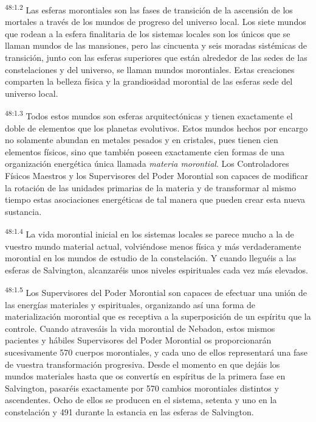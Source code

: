 \par
\textsuperscript{48:1.2} Las esferas morontiales son las fases de transición de la ascensión de los mortales a través de los mundos de progreso del universo local. Los siete mundos que rodean a la esfera finalitaria de los sistemas locales son los únicos que se llaman mundos de las mansiones, pero las cincuenta y seis moradas sistémicas de transición, junto con las esferas superiores que están alrededor de las sedes de las constelaciones y del universo, se llaman mundos morontiales. Estas creaciones comparten la belleza física y la grandiosidad morontial de las esferas sede del universo local.

\par
\textsuperscript{48:1.3} Todos estos mundos son esferas arquitectónicas y tienen exactamente el doble de elementos que los planetas evolutivos. Estos mundos hechos por encargo no solamente abundan en metales pesados y en cristales, pues tienen cien elementos físicos, sino que también poseen exactamente cien formas de una organización energética única llamada \textit{materia morontial}. Los Controladores Físicos Maestros y los Supervisores del Poder Morontial son capaces de modificar la rotación de las unidades primarias de la materia y de transformar al mismo tiempo estas asociaciones energéticas de tal manera que pueden crear esta nueva sustancia.

\par
\textsuperscript{48:1.4} La vida morontial inicial en los sistemas locales se parece mucho a la de vuestro mundo material actual, volviéndose menos física y más verdaderamente morontial en los mundos de estudio de la constelación. Y cuando lleguéis a las esferas de Salvington, alcanzaréis unos niveles espirituales cada vez más elevados.

\par
\textsuperscript{48:1.5} Los Supervisores del Poder Morontial son capaces de efectuar una unión de las energías materiales y espirituales, organizando así una forma de materialización morontial que es receptiva a la superposición de un espíritu que la controle. Cuando atravesáis la vida morontial de Nebadon, estos mismos pacientes y hábiles Supervisores del Poder Morontial os proporcionarán sucesivamente 570 cuerpos morontiales, y cada uno de ellos representará una fase de vuestra transformación progresiva. Desde el momento en que dejáis los mundos materiales hasta que os convertís en espíritus de la primera fase en Salvington, pasaréis exactamente por 570 cambios morontiales distintos y ascendentes. Ocho de ellos se producen en el sistema, setenta y uno en la constelación y 491 durante la estancia en las esferas de Salvington.

